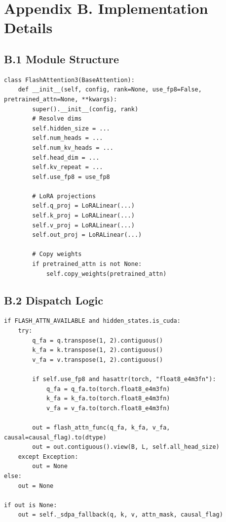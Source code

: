 \section{Appendix B. Implementation Details}

\subsection{B.1 Module Structure}

\begin{lstlisting}
class FlashAttention3(BaseAttention):
    def __init__(self, config, rank=None, use_fp8=False, pretrained_attn=None, **kwargs):
        super().__init__(config, rank)
        # Resolve dims
        self.hidden_size = ...
        self.num_heads = ...
        self.num_kv_heads = ...
        self.head_dim = ...
        self.kv_repeat = ...
        self.use_fp8 = use_fp8
        
        # LoRA projections
        self.q_proj = LoRALinear(...)
        self.k_proj = LoRALinear(...)
        self.v_proj = LoRALinear(...)
        self.out_proj = LoRALinear(...)
        
        # Copy weights
        if pretrained_attn is not None:
            self.copy_weights(pretrained_attn)
\end{lstlisting}

\subsection{B.2 Dispatch Logic}

\begin{lstlisting}
if FLASH_ATTN_AVAILABLE and hidden_states.is_cuda:
    try:
        q_fa = q.transpose(1, 2).contiguous()
        k_fa = k.transpose(1, 2).contiguous()
        v_fa = v.transpose(1, 2).contiguous()
        
        if self.use_fp8 and hasattr(torch, "float8_e4m3fn"):
            q_fa = q_fa.to(torch.float8_e4m3fn)
            k_fa = k_fa.to(torch.float8_e4m3fn)
            v_fa = v_fa.to(torch.float8_e4m3fn)
        
        out = flash_attn_func(q_fa, k_fa, v_fa, causal=causal_flag).to(dtype)
        out = out.contiguous().view(B, L, self.all_head_size)
    except Exception:
        out = None
else:
    out = None

if out is None:
    out = self._sdpa_fallback(q, k, v, attn_mask, causal_flag)
\end{lstlisting}

